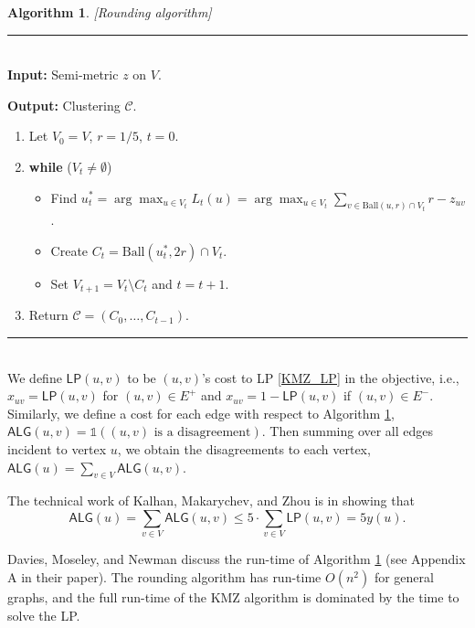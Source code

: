 \documentclass[11pt]{article}
\newtheorem{algorithm}{Algorithm}
\begin{document}
\begin{algorithm} \label{KMZ-alg}[Rounding algorithm]
\end{algorithm}

\begin{minipage}{13cm}
\rule{12cm}{0.4pt}\\
\noindent \textbf{Input: }Semi-metric $z$ on $V$.

\noindent \textbf{Output: }Clustering $\mathcal{C}$.
\begin{enumerate}
    \item Let $V_0 = V$, $r = 1/5$, $t=0$.
    \item \textbf{while} ($V_t \neq \emptyset$)
    \begin{itemize}
        \item Find $u^*_t = \arg \max_{u \in V_t} L_t(u) =  \arg \max_{u \in V_t} \sum_{v \in \text{Ball}(u,r) \cap V_t} {r-z_{uv}}$. 
        \item Create ${C_t = \text{Ball}(u^*_t,2r) \cap V_t}$.
        \item Set $V_{t+1} = V_t \setminus C_t$ and $t=t+1$.
    \end{itemize}
    \item Return ${\mathcal{C} = (C_0, \dots, C_{t-1})}$.
\end{enumerate}
    \rule{12cm}{0.4pt}
\end{minipage}\\

We define $\textsf{LP}(u,v)$ to be $(u,v)$'s cost to LP \ref{KMZ_LP} in the objective, i.e., $x_{uv}=\textsf{LP}(u,v)$ for $(u,v) \in E^+$ and 
$x_{uv}=1-\textsf{LP}(u,v)$ if $(u,v) \in E^-$. 
Similarly, we define a cost for each edge with respect to 
Algorithm \ref{KMZ-alg},
$\textsf{ALG}(u,v) = \mathds{1}((u,v) \text { is a disagreement})$.
Then summing over all edges incident to vertex $u$, we obtain the disagreements to each vertex, $\textsf{ALG}(u) = \sum_{v \in V} \textsf{ALG}(u,v)$.

The technical work of Kalhan, Makarychev, and Zhou \citeyearpar{KMZ19} is in showing that 
\begin{equation}\label{eq: KMZ}
    \textsf{ALG}(u) = \sum_{v \in V}\textsf{ALG}(u,v) \leq 
5 \cdot \sum_{v \in V}\textsf{LP}(u,v) = 5 y(u).
\end{equation} 


Davies, Moseley, and Newman \citeyearpar{DMN23} discuss the run-time of Algorithm \ref{KMZ-alg} (see Appendix A in their paper).
The rounding algorithm has run-time $O(n^2)$ for general graphs, 
and the full run-time of the KMZ algorithm is dominated by the time to solve the LP.
\end{document}
